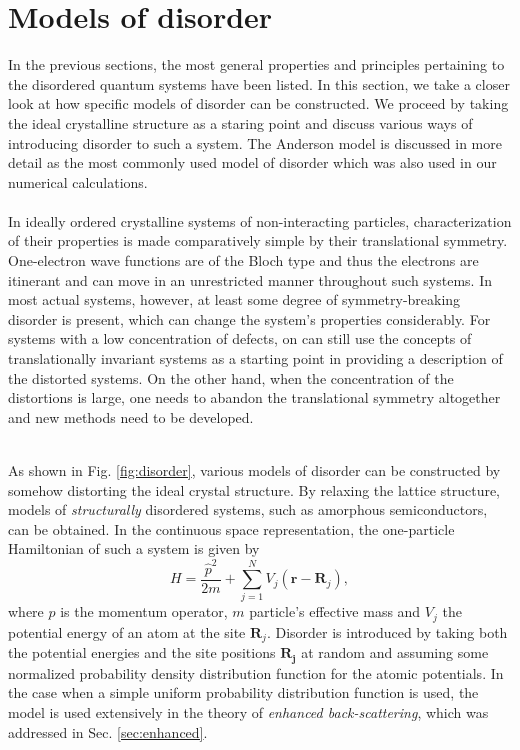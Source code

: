 \documentclass[10pt,a4paper]{article}
\begin{document}
\section{Models of disorder }
\label{sec:disorder}
In the previous sections, the most general properties and principles pertaining to the disordered quantum systems have been listed. In this section, we take a closer look at how specific models of disorder can be constructed. We proceed by taking the ideal crystalline structure as a staring point and discuss various ways of introducing disorder to such a system. The Anderson model is discussed in more detail as the most commonly used model of disorder which was also used in our numerical calculations. \\\\
\noindent
In ideally ordered crystalline systems of non-interacting particles, characterization of their properties is made comparatively simple by their translational symmetry. One-electron wave functions are of the Bloch type and thus the electrons are itinerant and can move in an unrestricted manner throughout such systems. In most actual systems, however, at least some degree of symmetry-breaking disorder is present, which can change the system's properties considerably. For systems with a low concentration of defects, on can still use the concepts of translationally invariant systems as a starting point in providing a description of the distorted systems. On the other hand, when the concentration of the distortions is large, one needs to abandon the translational symmetry altogether and new methods need to be developed. \\\\
\noindent  
\begin{minipage}[t]{0.6\textwidth}
\noindent As shown in Fig. \ref{fig:disorder}, various models of disorder can be constructed by somehow distorting the ideal crystal structure. By relaxing the lattice structure, models of \emph{structurally} disordered systems, such as amorphous semiconductors, can be obtained. In the continuous space representation, the one-particle Hamiltonian of such a system is given by
\begin{equation}\label{eq:amorphous_hamiltonian}
H=\frac{\hat{p}^2}{2m} + \sum\limits_{j=1}^N V_j(\mathbf{r}-\mathbf{R}_j),  
\end{equation}
where $\hat{p}$ is the momentum operator, $m$ particle's effective mass and $V_j$ the potential energy of an atom at the site $\mathbf{R}_j$. Disorder is introduced by taking both the potential energies and the site positions $\mathbf{R_j}$ at random and assuming some normalized probability density distribution function for the atomic potentials. In the case when a simple uniform probability distribution function is used, the model is used extensively in the theory of \emph{enhanced back-scattering}, which was addressed in Sec. \ref{sec:enhanced}.
\end{minipage}\hfill
\end{document}
